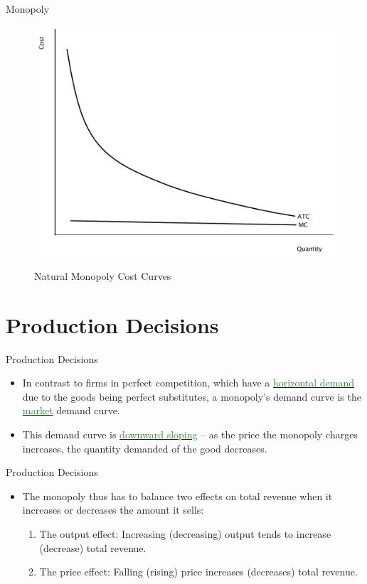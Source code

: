 \documentclass[xcolor={dvipsnames},pdf, hyperref={colorlinks=true, citecolor=ForestGreen, linkcolor=BlueViolet, urlcolor=Magenta}]{beamer}
\newcommand{\ddp}[1]{{\textcolor{ForestGreen}{#1}}}
\newcommand{\dd}[1]{{\underline{\textcolor{ForestGreen}{#1}}}}
\begin{document}
\begin{frame}[b]{Monopoly}
	\begin{figure}[H]
	\centering
	\ddp{\includegraphics[scale=.40]{plot74.pdf}}
	\caption{Natural Monopoly Cost Curves}
\end{figure}
\end{frame}

\section{Production Decisions}

\begin{frame}{Production Decisions}
\begin{itemize}
	\item In contrast to firms in perfect competition, which have a \dd{horizontal demand} due to the goods being perfect substitutes, a monopoly's demand curve is the \dd{market} demand curve. 
	\item This demand curve is \dd{downward sloping} -- as the price the monopoly charges increases, the quantity demanded of the good decreases.

\end{itemize}
\end{frame}

\begin{frame}{Production Decisions}
	\begin{itemize}
		\item The monopoly thus has to balance two effects on total revenue when it increases or decreases the amount it sells:
		
		\begin{enumerate}
			\item The output effect: Increasing (decreasing) output tends to increase (decrease) total revenue.
			\item The price effect: Falling (rising) price increases (decreases) total revenue.
		\end{enumerate}
		
	\end{itemize}
\end{frame}
\end{document}
